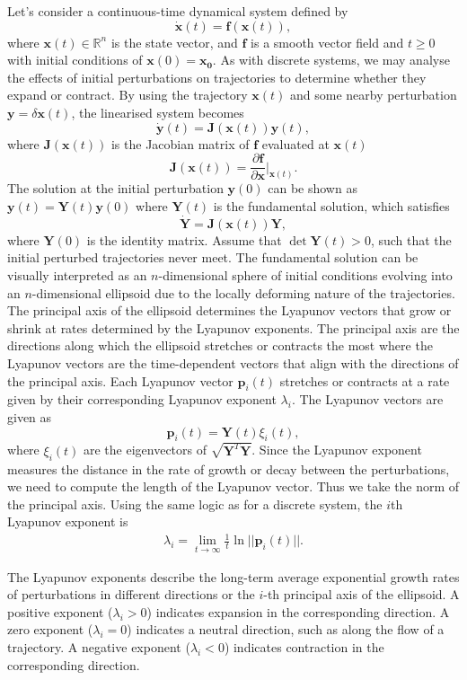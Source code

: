 Let's consider a continuous-time dynamical system defined by
$$
\dot{\mathbf{x}}(t) = \mathbf{f}(\mathbf{x}(t)),
$$
where $\mathbf{x}(t) \in \mathbb{R}^n$ is the state vector, and $\mathbf{f}$ is a smooth vector field and $t \geq0$ with initial conditions of $\mathbf{x}(0)=\mathbf{x_0}$. As with discrete systems, we may analyse the effects of initial perturbations on trajectories to determine whether they expand or contract. By using the trajectory $\mathbf{x}(t)$ and some nearby perturbation $\mathbf{y}=\delta\mathbf{x}(t)$, the linearised system becomes
$$
\dot{\mathbf{y}}(t) = \mathbf{J}(\mathbf{x}(t))\mathbf{y}(t),
$$
where $\mathbf{J}(\mathbf{x}(t))$ is the Jacobian matrix of $\mathbf{f}$ evaluated at $\mathbf{x}(t)$
$$
\mathbf{J}(\mathbf{x}(t)) = \frac{\partial \mathbf{f}}{\partial \mathbf{x}} \bigg|_{\mathbf{x}(t)}.
$$
The solution at the initial perturbation $\mathbf{y}(0)$ can be shown as $\mathbf{y}(t)=\mathbf{Y}(t)\mathbf{y}(0)$ where $\mathbf{Y}(t)$ is the fundamental solution, which satisfies
$$
\dot{\mathbf{Y}}=\mathbf{J}(\mathbf{x}(t))\mathbf{Y},
$$
where $\mathbf{Y}(0)$ is the identity matrix. Assume that $\det \mathbf{Y}(t)>0$, such that the initial perturbed trajectories never meet. The fundamental solution can be visually interpreted as an $n$-dimensional sphere of initial conditions evolving into an $n$-dimensional ellipsoid due to the locally deforming nature of the trajectories. The principal axis of the ellipsoid determines the Lyapunov vectors that grow or shrink at rates determined by the Lyapunov exponents. The principal axis are the directions along which the ellipsoid stretches or contracts the most where the Lyapunov vectors are the time-dependent vectors that align with the directions of the principal axis. Each Lyapunov vector $\mathbf{p}_i(t)$ stretches or contracts at a rate given by their corresponding Lyapunov exponent $\lambda_i$. The Lyapunov vectors are given as
$$
\mathbf{p}_i(t)=\mathbf{Y}(t)\xi_i(t),
$$
where $\xi_i(t)$ are the eigenvectors of $\sqrt{\mathbf{Y}^T\mathbf{Y}}$. Since the Lyapunov exponent measures the distance in the rate of growth or decay between the perturbations, we need to compute the length of the Lyapunov vector. Thus we take the norm of the principal axis. Using the same logic as for a discrete system, the $i$th Lyapunov exponent \cite{OED} is 
\begin{align}
    \lambda_i=\lim_{t \to \infty}\frac{1}{t}\ln ||\mathbf{p}_i(t)||.  \label{eq:lyapunov_cont} 
\end{align}

The Lyapunov exponents describe the long-term average exponential growth rates of perturbations in different directions or the $i$-th principal axis of the ellipsoid. A positive exponent ($\lambda_i > 0$) indicates expansion in the corresponding direction. A zero exponent ($\lambda_i = 0$) indicates a neutral direction, such as along the flow of a trajectory. A negative exponent ($\lambda_i < 0$) indicates contraction in the corresponding direction.


